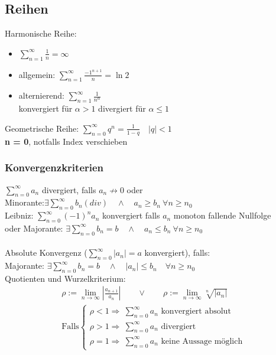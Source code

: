 \documentclass[6pt,a4paper]{scrartcl}
\newcommand{\abs}[1]{\ensuremath{\left\vert#1\right\vert}}
\newcommand{\Ra}[0]{\ensuremath{\Rightarrow}}
\begin{document}
\begin{multicols}{4}
\subsection{Reihen}
Harmonische Reihe:
\begin{itemize}\itemsep-2pt
\item $\sum\limits_{n=1}^\infty \frac{1}{n} = \infty$ 
\item allgemein: $\sum\limits_{n=1}^\infty \frac{-1^{n+1}}{n} = \ln 2$
\item alternierend: $\sum\limits_{n=1}^\infty \frac{1}{n^\alpha}$ \\
konvergiert für $\alpha > 1$ \quad divergiert für $\alpha \leq 1$
\end{itemize}
Geometrische Reihe: $\sum\limits_{n=0}^{\infty}q^n = \frac{1}{1-q} \quad|q|<1$ \\
\textbf{n = 0}, notfalls Index verschieben

\subsubsection{Konvergenzkriterien}
$\sum\limits^{\infty}_{n = 0} a_n$ divergiert, falls $a_n \not \rightarrow 0$ oder\\
Minorante:$\exists \sum\limits^{\infty}_{n = 0} b_n (div) \quad \land \quad a_n \ge b_n \ \forall n\ge n_0$\\[0.6em] 
Leibniz: $\sum\limits^{\infty}_{n = 0}(-1)^n a_n$ konvergiert falls $a_n$ monoton fallende Nullfolge\\
oder Majorante: $\exists \sum\limits^{\infty}_{n = 0} b_n = b \quad \land \quad a_n \le b_n \ \forall n\ge n_0$\\
\\
Absolute Konvergenz ($\sum\limits^\infty_{n=0} |a_n|=a$ konvergiert), falls:\\
Majorante: $\exists \sum\limits^{\infty}_{n = 0} b_n = b \quad \land \quad |a_n| \le b_n \quad \forall n\ge n_0$\\
Quotienten und Wurzelkriterium:
\begin{eqnarray*}
	\rho := \lim_{n \rightarrow \infty} \abs{\frac{a_{n+1}}{a_n}} \qquad \lor \qquad \rho := \lim_{n \rightarrow \infty} \sqrt[n]{\abs{a_n}}\\
	\text{Falls} 
	\begin{cases}
		\rho < 1 \Ra  ~\sum\limits^\infty_{n=0} a_n \text{ konvergiert absolut} \\
		\rho > 1 \Ra  ~\sum\limits^\infty_{n=0} a_n \text{ divergiert} \\
		\rho = 1 \Ra ~ \sum\limits^\infty_{n=0} a_n \text{ keine Aussage möglich}
	\end{cases}
\end{eqnarray*}
\\



\end{multicols}
\end{document}
